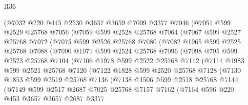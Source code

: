 \begin{lexlean}{R36}
\begin{coremodule}
      (@7032
        @220
        @445
        @2530
        @3657
        @3659
        @7009
        @3377
        @7046
        (@7051
          @599
          @2529
          @25768
          @7056
          (@7059
            @599
            @2528
            @25768
            @7064
            (@7067
              @599
              @2527
              @25768
              @7072
              (@7075
                @599
                @2526
                @25768
                @7080
                (@7082
                  @1965
                  @599
                  @2525
                  @25768
                  @7088
                  (@7090
                    @1971
                    @599
                    @2524
                    @25768
                    @7096
                    (@7098
                      @795
                      @599
                      @2523
                      @25768
                      @7104
                      (@7106
                        @1978
                        @599
                        @2522
                        @25768
                        @7112
                        (@7114
                          @1983
                          @599
                          @2521
                          @25768
                          @7120
                          (@7122
                            @1828
                            @599
                            @2520
                            @25768
                            @7128
                            (@7130
                              @1853
                              @599
                              @2519
                              @25768
                              @7136
                              (@7138
                                @1506
                                @599
                                @2518
                                @25768
                                @7144
                                (@7149
                                  @599
                                  @2517
                                  @2687
                                  @7025
                                  @25768
                                  @7157
                                  @7162
                                  (@7164
                                    @596
                                    @220
                                    @453
                                    @3657
                                    @3657
                                    @2687
                                    @3377

\end{coremodule}
\end{lexlean}

